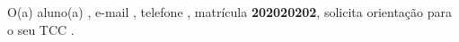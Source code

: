 O(a) aluno(a) \textbf{\student}, e-mail \textbf{\studentemail}, telefone \textbf{\studentphone}, matrícula \textbf{202020202}, solicita orientação para o seu TCC \textbf{\tcctitle}.